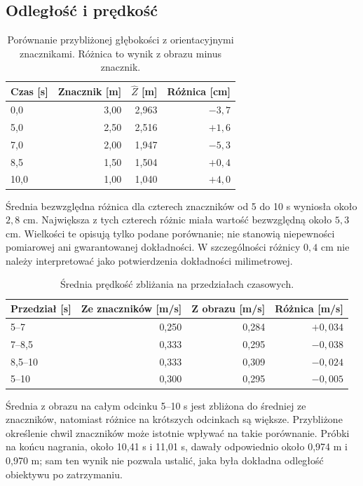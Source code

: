 \documentclass[12pt,a4paper]{article}
\begin{document}
\subsection{Odległość i prędkość}

\begin{table}[htbp]
\centering
\caption{Porównanie przybliżonej głębokości z orientacyjnymi znacznikami. Różnica to wynik z obrazu minus znacznik.}
\label{tab:dynamic}
\begin{tabular}{lrrr}
\toprule
Czas [s] & Znacznik [m] & $\widehat Z$ [m] & Różnica [cm] \\
\midrule
0,0 & 3,00 & 2,963 & $-3,7$ \\
5,0 & 2,50 & 2,516 & $+1,6$ \\
7,0 & 2,00 & 1,947 & $-5,3$ \\
8,5 & 1,50 & 1,504 & $+0,4$ \\
10,0 & 1,00 & 1,040 & $+4,0$ \\
\bottomrule
\end{tabular}
\end{table}

Średnia bezwzględna różnica dla czterech znaczników od 5 do 10 s wyniosła około $2{,}8$ cm. Największa z tych czterech różnic miała wartość bezwzględną około $5{,}3$ cm. Wielkości te opisują tylko podane porównanie; nie stanowią niepewności pomiarowej ani gwarantowanej dokładności. W szczególności różnicy $0{,}4$ cm nie należy interpretować jako potwierdzenia dokładności milimetrowej.

\begin{table}[htbp]
\centering
\caption{Średnia prędkość zbliżania na przedziałach czasowych.}
\label{tab:speed}
\begin{tabular}{lrrr}
\toprule
Przedział [s] & Ze znaczników [m/s] & Z obrazu [m/s] & Różnica [m/s] \\
\midrule
5--7 & 0,250 & 0,284 & $+0,034$ \\
7--8,5 & 0,333 & 0,295 & $-0,038$ \\
8,5--10 & 0,333 & 0,309 & $-0,024$ \\
5--10 & 0,300 & 0,295 & $-0,005$ \\
\bottomrule
\end{tabular}
\end{table}

Średnia z obrazu na całym odcinku 5--10 s jest zbliżona do średniej ze znaczników, natomiast różnice na krótszych odcinkach są większe. Przybliżone określenie chwil znaczników może istotnie wpływać na takie porównanie. Próbki na końcu nagrania, około 10,41 s i 11,01 s, dawały odpowiednio około 0,974 m i 0,970 m; sam ten wynik nie pozwala ustalić, jaka była dokładna odległość obiektywu po zatrzymaniu.
\end{document}
